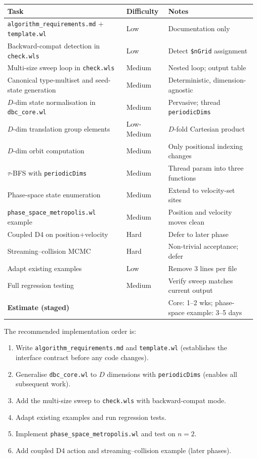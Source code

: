 \documentclass[12pt,a4paper]{article}
\begin{document}
\begin{center}
\begin{tabular}{p{6.5cm}lp{4.5cm}}
\toprule
Task & Difficulty & Notes \\
\midrule
\texttt{algorithm\_requirements.md} + \texttt{template.wl} & Low &
  Documentation only \\
Backward-compat detection in \texttt{check.wls} & Low &
  Detect \texttt{\$nGrid} assignment \\
Multi-size sweep loop in \texttt{check.wls} & Medium &
  Nested loop; output table \\
Canonical type-multiset and seed-state generation & Medium &
  Deterministic, dimension-agnostic \\
$D$-dim state normalisation in \texttt{dbc\_core.wl} & Medium &
  Pervasive; thread \texttt{periodicDims} \\
$D$-dim translation group elements & Low-Medium &
  $D$-fold Cartesian product \\
$D$-dim orbit computation & Medium &
  Only positional indexing changes \\
$\tau$-BFS with \texttt{periodicDims} & Medium &
  Thread param into three functions \\
Phase-space state enumeration & Medium &
  Extend to velocity-set sites \\
\texttt{phase\_space\_metropolis.wl} example & Medium &
  Position and velocity moves clean \\
Coupled D4 on position+velocity & Hard &
  Defer to later phase \\
Streaming--collision MCMC & Hard &
  Non-trivial acceptance; defer \\
Adapt existing examples & Low &
  Remove 3 lines per file \\
Full regression testing & Medium &
  Verify sweep matches current output \\
\midrule
\textbf{Estimate (staged)} & & Core: 1--2 wks; phase-space example: 3--5 days \\
\bottomrule
\end{tabular}
\end{center}

\medskip
The recommended implementation order is:
\begin{enumerate}
  \item Write \texttt{algorithm\_requirements.md} and \texttt{template.wl}
    (establishes the interface contract before any code changes).
  \item Generalise \texttt{dbc\_core.wl} to $D$ dimensions with
    \texttt{periodicDims} (enables all subsequent work).
  \item Add the multi-size sweep to \texttt{check.wls} with backward-compat
    mode.
  \item Adapt existing examples and run regression tests.
  \item Implement \texttt{phase\_space\_metropolis.wl} and test on $n=2$.
  \item Add coupled D4 action and streaming--collision example (later phases).
\end{enumerate}
\end{document}
